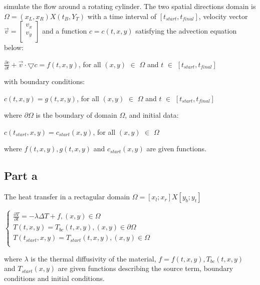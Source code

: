 \documentclass[12pt]{article}
\begin{document}
simulate the flow around a rotating cylinder.  The two spatial directions domain is $\Omega = (x_L, x_R) X(t_B,Y_T)$ with a time interval of $[t_{start}, t_{final}]$, velocity vector $\overrightarrow{v} = \begin{bmatrix}
           v_x \\
          v_y \\
         \end{bmatrix}$ and a function $c = c(t,x,y)$ satisfying the advection equation below:\\
\begin{center}
$
\frac{\partial c}{\partial t} + \overrightarrow{v} \cdot \bigtriangledown c = f(t,x,y)$, for all $(x,y)$ $ \in$ $ \Omega$ and $ t$ $ \in$ $ [t_{start},t_{final}]$
\end{center}
with boundary conditions:\\
\begin{center}
$c(t,x,y) = g(t,x,y)$, for all $(x,y)$ $ \in$ $ \Omega$ and $ t$ $ \in$ $ [t_{start},t_{final}]$
\end{center}
where $\partial \Omega$ is the boundary of domain $\Omega$, and initial data:
\begin{center}
$c(t_{start},x,y) = c_{start}(x,y)$, for all $(x,y)$ $ \in$ $ \Omega$
\end{center}
where $f(t,x,y), g(t,x,y)$ and $c_{start}(x,y)$ are given functions.
\subsection{Part a}\label{sec::a}
The heat transfer in a rectagular domain $\Omega = [x_l;x_r]X[y_b;y_t]$

\begin{center}
$\begin{cases} 
\frac{\partial T}{\partial t} = -\lambda \Delta T + f, (x,y) \in \Omega  \\
T(t,x,y) = T_{bc}(t,x,y), (x,y) \in \partial \Omega  \\
T(t_{start},x,y) = T_{start}(t,x,y), (x,y) \in \Omega  \\
 \end{cases}$
\end{center}
where $\lambda$ is the thermal diffusivity of the material, $f=f(t,x,y), T_{bc}(t,x,y)$ and $T_{start}(x,y)$ are given functions describing the source term, boundary conditions and initial conditions.
\end{document}
